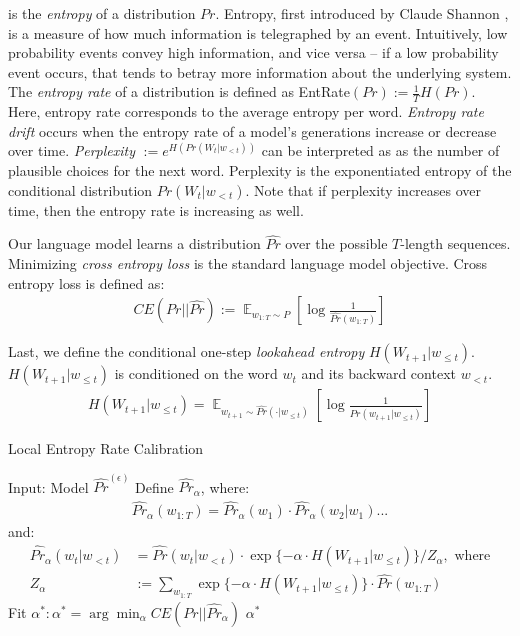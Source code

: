 \documentclass[pageno]{jpaper}
\DeclareMathOperator*{\E}{\mathbb{E}}
\begin{document}
is the \textit{entropy} of a distribution $Pr$. Entropy, first introduced by Claude Shannon \cite{shannon-ie}, is a measure of how much information is telegraphed by an event. Intuitively, low probability events convey high information, and vice versa -- if a low probability event occurs, that tends to betray more information about the underlying system. The \textit{entropy rate} of a distribution is defined as EntRate$(Pr) := \frac{1}{T}H(Pr)$. Here, entropy rate corresponds to the average entropy per word. \textit{Entropy rate drift} occurs when the entropy rate of a model's generations increase or decrease over time. \textit{Perplexity} $:= e^{H(Pr(W_t|w_{<t}))}$ can be interpreted as as the number of plausible choices for the next word. Perplexity is the exponentiated entropy of the conditional distribution $Pr(W_t | w_{<t})$. Note that if perplexity increases over time, then the entropy rate is increasing as well. 

Our language model learns a distribution $\widehat{Pr}$ over the possible $T$-length sequences. Minimizing \textit{cross entropy loss} is the standard language model objective. Cross entropy loss is defined as:
\begin{align*}
    CE(Pr || \widehat{Pr}) := \E_{w_{1:T} \sim P} \left[\log \frac{1}{\widehat{Pr}(w_{1:T})}\right]
\end{align*}

Last, we define the conditional one-step \textit{lookahead entropy} $H(W_{t+1} | w_{\leq t})$. $H(W_{t+1} | w_{\leq t})$ is conditioned on the word $w_t$ and its backward context $w_{<t}$.
\begin{align*}
    H(W_{t+1} | w_{\leq t}) = \E_{w_{t+1} \sim \widehat{Pr}(\cdot | w_{\leq t})} \left[ \log \frac{1}{\widehat{Pr}(w_{t+1} | w_{\leq t})}\right]    
\end{align*}

\begin{algorithm}
    \renewcommand{\thealgorithm}{2}
    \caption{Local Entropy Rate Calibration}
    \begin{algorithmic}[1]
    \State Input: Model $\widehat{Pr}^{(\epsilon)}$
    \State Define $\widehat{Pr}_\alpha$, where:
    \begin{align*}
        \widehat{Pr}_\alpha (w_{1:T}) = \widehat{Pr}_\alpha(w_1) \cdot \widehat{Pr}_\alpha(w_2 | w_1) ...
    \end{align*}
    and:
    \begin{align*}
        \widehat{Pr}_\alpha(w_t | w_{<t}) &= \widehat{Pr} (w_t | w_{<t}) \cdot \exp \{ -\alpha \cdot H(W_{t+1} | w_{\leq t})\} / Z_\alpha, \text{ where} \\
        Z_\alpha &:= \sum_{w_{1:T}} \exp \{-\alpha \cdot H(W_{t+1} | w_{\leq t})\} \cdot \widehat{Pr}(w_{1:T})
    \end{align*}
    \State Fit $\alpha^*: \alpha^* = \arg \min_\alpha CE(Pr || \widehat{Pr}_\alpha)$
    \State \Return $\alpha^*$
    \end{algorithmic}
    \label{Alg2}
\end{algorithm}
\end{document}
